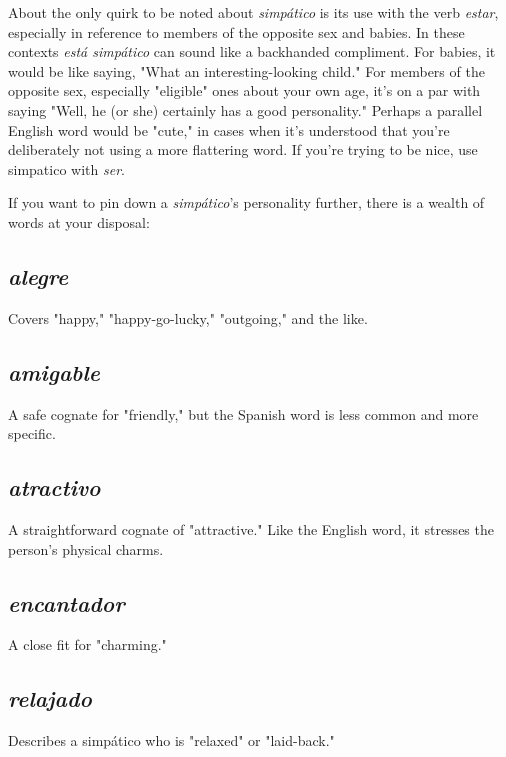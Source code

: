 \documentclass[14pt,a4paper,oneside]{memoir}
\begin{document}
About the only quirk to be noted about \emph{simpático} is its use
with the verb \emph{estar}, especially in reference to members of the opposite
sex and babies. In these contexts \emph{está simpático} can sound like a backhanded compliment. For babies, it would be like saying, "What an
interesting-looking child." For members of the opposite sex, especially
"eligible" ones about your own age, it's on a par with saying "Well, he
(or she) certainly has a good personality." Perhaps a parallel English
word would be "cute," in cases when it's understood that you're deliberately not using a more flattering word. If you're trying to be nice, use
simpatico with \emph{ser}.

If you want to pin down a \emph{simpático}'s personality further,
there is a wealth of words at your disposal:

\subsection{\emph{alegre}}

Covers "happy," "happy-go-lucky," "outgoing," and
the like.

\subsection{\emph{amigable}}

A safe cognate for "friendly," but the Spanish
word is less common and more specific.

\subsection{\emph{atractivo}}

A straightforward cognate of "attractive." Like
the English word, it stresses the person's physical charms.

\subsection{\emph{encantador}}

A close fit for "charming."

\subsection{\emph{relajado}}

Describes a simpático who is "relaxed" or "laid-back."
\end{document}
